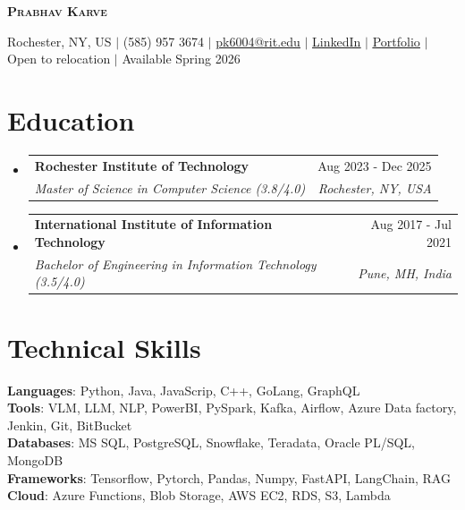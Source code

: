\documentclass[letterpaper,10.5pt]{article}
\makeatletter
\newcommand{\resumeSubheading}[4]{
  \vspace{-2pt}\item
    \begin{tabular*}{0.97\textwidth}[t]{l@{\extracolsep{\fill}}r}
      \textbf{#1} & #2 \\
      \textit{\small#3} & \textit{\small #4} \\
    \end{tabular*}
}
\newcommand{\resumeSubHeadingListStart}{\begin{itemize}[leftmargin=0.15in, label={}]}
\newcommand{\resumeSubHeadingListEnd}{\end{itemize}}
\makeatother
\begin{document}
\begin{center}
\vspace{-20pt}
    \textbf{\Large \scshape Prabhav Karve} \\ \vspace{1pt}
    
    \small {Rochester, NY, US} $|$ (585) 957 3674 $|$ \href{mailto:pk6004@g.rit.edu}{{\underline{pk6004@rit.edu}}} $|$ 
    \href{https://www.linkedin.com/in/prabhav-karve-11300a145/}{\underline{LinkedIn}} $|$
    \href{https://prabhav-karve-portfolio2-0.vercel.app/}{\underline{Portfolio}} $|$
    {Open to relocation }$|$
    {Available Spring 2026}
\vspace{-3pt}
\end{center}


\section{Education}
  \resumeSubHeadingListStart
    \resumeSubheading
      {Rochester Institute of Technology}{Aug 2023 - Dec 2025}
      {Master of Science in Computer Science (3.8/4.0)}{Rochester, NY, USA}
      {}
      \vspace{-5pt}
    \resumeSubheading
       {International Institute of Information Technology }{Aug 2017 - Jul 2021}
      {Bachelor of Engineering in Information Technology (3.5/4.0)}{Pune, MH, India}
      {}
  \resumeSubHeadingListEnd



\section{Technical Skills}
 \begin{itemize}[leftmargin=0.15in, label={}]
    \small{\item{
     \textbf{Languages}{: Python, Java, JavaScrip, C++, GoLang, GraphQL} \\
     \textbf{Tools}{:  VLM, LLM, NLP, PowerBI, PySpark, Kafka, Airflow, Azure Data factory, Jenkin, Git, BitBucket} \\
     \textbf{Databases}{: MS SQL, PostgreSQL, Snowflake, Teradata, Oracle PL/SQL, MongoDB}\\
     \textbf{Frameworks}{: Tensorflow, Pytorch, Pandas, Numpy,  FastAPI, LangChain, RAG } \\
     \textbf{Cloud}{: Azure Functions, Blob Storage, AWS EC2, RDS, S3, Lambda} 
    }}
 \end{itemize}
\end{document}
